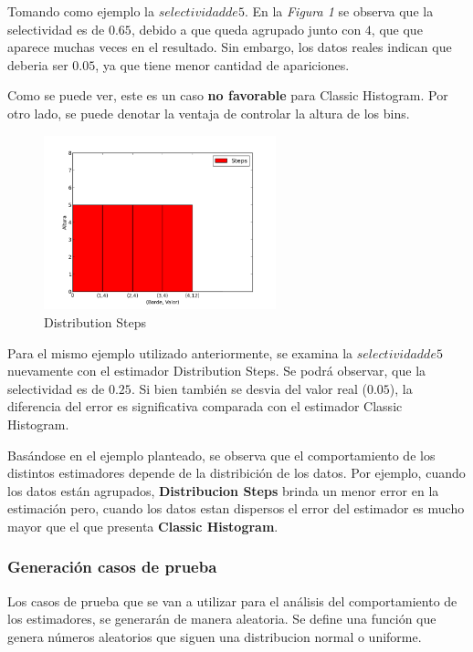 \documentclass[10pt, a4paper,english,spanish,hidelinks]{article}
\begin{document}
Tomando como ejemplo la $selectividad de 5$.
En la \textit{Figura 1} se observa que la selectividad es de $0.65$, debido a que queda agrupado junto
con $4$, que que aparece muchas veces en el resultado. Sin embargo, los datos reales indican que deberia ser $0.05$, ya que tiene menor cantidad de apariciones.

Como se puede ver, este es un caso \textbf{no favorable} para Classic Histogram. Por otro lado, se puede denotar la ventaja de controlar la altura de los bins.


\begin{figure}[h!]
  \centering
  \includegraphics[width=0.6\textwidth]{./imagenes/ejb1_ejemplo_steps.png}
  \caption{Distribution Steps}
\end{figure}


Para el mismo ejemplo utilizado anteriormente, se examina la $selectividad de 5$ nuevamente con el estimador Distribution Steps.
Se podrá observar, que la selectividad es de $0.25$. Si bien también se desvia del
valor real ($0.05$), la diferencia del error es significativa comparada con el estimador Classic Histogram.


Basándose en el ejemplo planteado, se observa que el comportamiento de los distintos estimadores
depende de la distribición de los datos.
Por ejemplo, cuando los datos están agrupados, \textbf{Distribucion Steps} brinda un menor
error en la estimación pero, cuando los datos estan dispersos el error del estimador es
mucho mayor que el que presenta \textbf{Classic Histogram}.


\subsubsection{Generación casos de prueba}
Los casos de prueba que se van a utilizar para el análisis del comportamiento de los
estimadores, se generarán de manera aleatoria. Se define una función que genera números
aleatorios que siguen una distribucion normal o uniforme.
\end{document}
